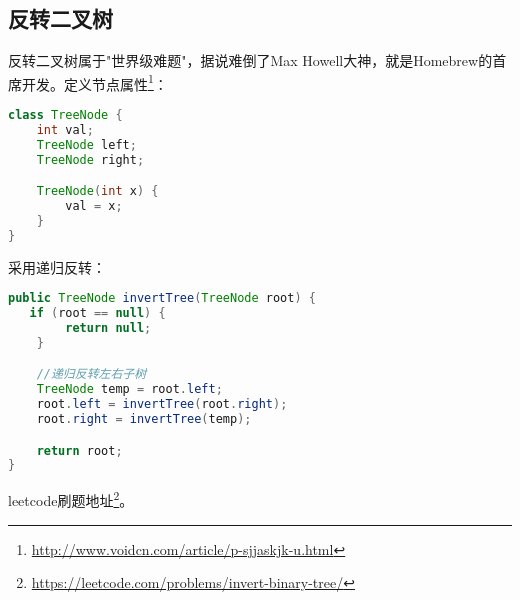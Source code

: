 \documentclass[../../../interview-questions.tex]{subfiles}
\begin{document}
\subsection{反转二叉树}

反转二叉树属于"世界级难题"，据说难倒了Max Howell大神，就是Homebrew的首席开发。定义节点属性\footnote{\url{http://www.voidcn.com/article/p-sjjaskjk-u.html}}：

\begin{lstlisting}[language=Java]
class TreeNode {
    int val;
    TreeNode left;
    TreeNode right;

    TreeNode(int x) {
        val = x;
    }
}
\end{lstlisting}

采用递归反转：

\begin{lstlisting}[language=Java]
public TreeNode invertTree(TreeNode root) {
   if (root == null) {
        return null;
    }

    //递归反转左右子树
    TreeNode temp = root.left;
    root.left = invertTree(root.right);
    root.right = invertTree(temp);

    return root; 
}
\end{lstlisting}

leetcode刷题地址\footnote{\url{https://leetcode.com/problems/invert-binary-tree/}}。
\end{document}
